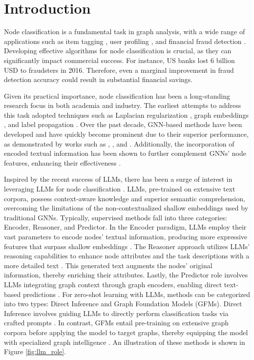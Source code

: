 \section{Introduction}

Node classification is a fundamental task in graph analysis, with a wide range of applications such as item tagging \cite{Mao2020ItemTF}, user profiling \cite{Yan2021RelationawareHG}, and financial fraud detection \cite{Zhang2022eFraudComAE}. Developing effective algorithms for node classification is crucial, as they can significantly impact commercial success. For instance, US banks lost 6 billion USD to fraudsters in 2016. Therefore, even a marginal improvement in fraud detection accuracy could result in substantial financial savings.

Given its practical importance, node classification has been a long-standing research focus in both academia and industry. The earliest attempts to address this task adopted techniques such as Laplacian regularization \cite{belkin2006manifold}, graph embeddings \cite{yang2016revisiting}, and label propagation \cite{zhu2003semi}. Over the past decade, GNN-based methods have been developed and have quickly become prominent due to their superior performance, as demonstrated by works such as \citet{kipf2017GCN}, \citet{velickovic2018GAT}, and \citet{hamilton2017SAGE}. Additionally, the incorporation of encoded textual information has been shown to further complement GNNs' node features, enhancing their effectiveness \cite{jin2023patton, zhao2022GLEM}.

Inspired by the recent success of LLMs, there has been a surge of interest in leveraging LLMs for node classification \cite{li2023survey}. LLMs, pre-trained on extensive text corpora, possess context-aware knowledge and superior semantic comprehension, overcoming the limitations of the non-contextualized shallow embeddings used by traditional GNNs. Typically, supervised methods fall into three categories: Encoder, Reasoner, and Predictor. In the Encoder paradigm, LLMs employ their vast parameters to encode nodes' textual information, producing more expressive features that surpass shallow embeddings \cite{Zhu2024ENGINE}. The Reasoner approach utilizes LLMs' reasoning capabilities to enhance node attributes and the task descriptions with a more detailed text \cite{chen2024exploring, he2023TAPE}. This generated text augments the nodes' original information, thereby enriching their attributes. Lastly, the Predictor role involves LLMs integrating graph context through graph encoders, enabling direct text-based predictions  \cite{chen23llaga,tang2023graphgpt,chai2023graphllm,Huang2024GraphAdapter}. For zero-shot learning with LLMs, methods can be categorized into two types: Direct Inference and Graph Foundation Models (GFMs). Direct Inference involves guiding LLMs to directly perform classification tasks via crafted prompts \cite{Huang2023CanLE}. In contrast, GFMs entail pre-training on extensive graph corpora before applying the model to target graphs, thereby equipping the model with specialized graph intelligence \cite{li2024zerog}. An illustration of these methods is shown in Figure \ref{fig:llm_role}. 


